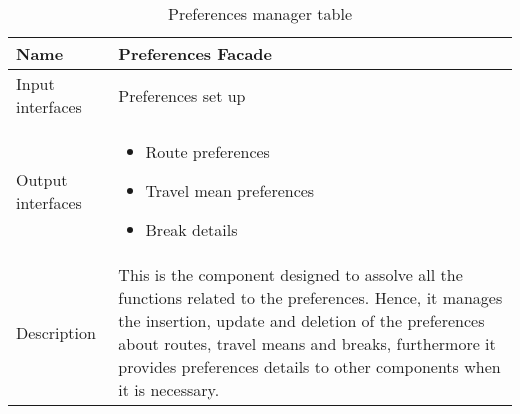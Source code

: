 \begin{flushleft}
	
	\begin{table}[htp]
		
		\begin{tabular}{l|p{7cm}}
		
			Name&\textbf{Preferences Facade}\\
			\hline
			\hline
			Input interfaces& Preferences set up \\
			\hline
			Output interfaces&
			\begin{itemize}
					 \item Route preferences \item Travel mean preferences \item Break details
			\end{itemize}
			\\
			\hline
			Description&This is the component designed to assolve all the functions related to the preferences. Hence, it manages the insertion, update and deletion of the preferences about routes, travel means and breaks, furthermore it provides preferences details to other components when it is necessary. \\
			\hline
			
		\end{tabular}
		
		\caption{Preferences manager table } 
		\label{tab:preferencesmanagertable}
		
	\end{table}
	
\end{flushleft}

